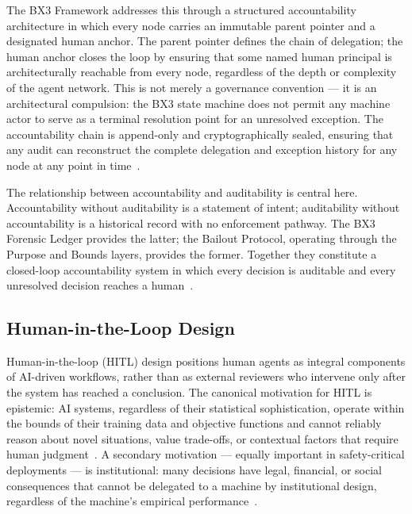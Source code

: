 The BX3 Framework addresses this through a structured accountability architecture in which every node carries an immutable parent pointer and a designated human anchor. The parent pointer defines the chain of delegation; the human anchor closes the loop by ensuring that some named human principal is architecturally reachable from every node, regardless of the depth or complexity of the agent network. This is not merely a governance convention --- it is an architectural compulsion: the BX3 state machine does not permit any machine actor to serve as a terminal resolution point for an unresolved exception. The accountability chain is append-only and cryptographically sealed, ensuring that any audit can reconstruct the complete delegation and exception history for any node at any point in time~\cite{wiener1948}.

The relationship between accountability and auditability is central here. Accountability without auditability is a statement of intent; auditability without accountability is a historical record with no enforcement pathway. The BX3 Forensic Ledger provides the latter; the Bailout Protocol, operating through the Purpose and Bounds layers, provides the former. Together they constitute a closed-loop accountability system in which every decision is auditable and every unresolved decision reaches a human~\cite{bansal2019}.

\subsection{Human-in-the-Loop Design}
\label{sec:hitl}

Human-in-the-loop (HITL) design positions human agents as integral components of AI-driven workflows, rather than as external reviewers who intervene only after the system has reached a conclusion. The canonical motivation for HITL is epistemic: AI systems, regardless of their statistical sophistication, operate within the bounds of their training data and objective functions and cannot reliably reason about novel situations, value trade-offs, or contextual factors that require human judgment~\cite{tristr81}. A secondary motivation --- equally important in safety-critical deployments --- is institutional: many decisions have legal, financial, or social consequences that cannot be delegated to a machine by institutional design, regardless of the machine's empirical performance~\cite{bansal2019}.

